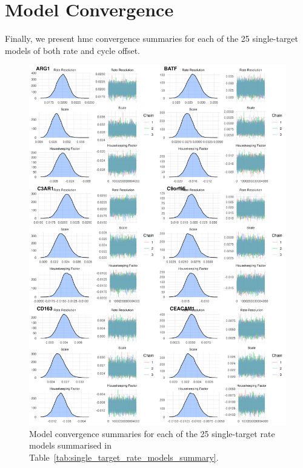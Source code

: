 \documentclass[../thesis.tex]{subfiles}
\begin{document}
\section{Model Convergence}
Finally, we present \gls{hmc} convergence summaries for each of the 25 single-target models of both rate and cycle offset.
\begin{figure}[!hb]
    \centering
    \includegraphics[width=\textwidth]{figures/chapter2/model_summaries_5.png}
    \caption{Model convergence summaries for each of the 25 single-target rate models summarised in Table~\ref{tab:single_target_rate_models_summary}.}
    \label{fig:convergence_5}
\end{figure}
\end{document}
